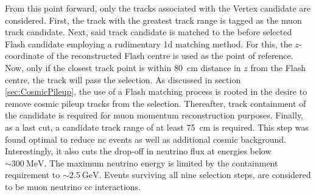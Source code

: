 From this point forward, only the tracks associated with the \gls{Vertex} candidate are considered. First, the track with the greatest track range is tagged as the muon track candidate. Next, said track candidate is matched to the before selected \gls{Flash} candidate employing a rudimentary \gls{1d} matching method. For this, the $z$-coordinate of the reconstructed \gls{Flash} centre is used as the point of reference. Now, only if the closest track point is within \SI{80}{\centi\metre} distance in $z$ from the \gls{Flash} centre, the track will pass the selection. As discussed in section \ref{sec:CosmicPileup}, the use of a \gls{Flash} matching process is rooted in the desire to remove cosmic pileup tracks from the selection. Thereafter, track containment of the candidate is required for muon momentum reconstruction purposes. Finally, as a last cut, a candidate track range of at least \SI{75}{\centi\metre} is required. This step was found optimal to reduce \gls{nc} events as well as additional cosmic background. Interestingly, it also cuts the drop-off in neutrino flux at energies below $\sim \SI{300}{\mega\electronvolt}$. The maximum neutrino energy is limited by the containment requirement to $\sim \SI{2.5}{\giga\electronvolt}$. Events surviving all nine selection steps, are considered to be muon neutrino \gls{cc} interactions.

